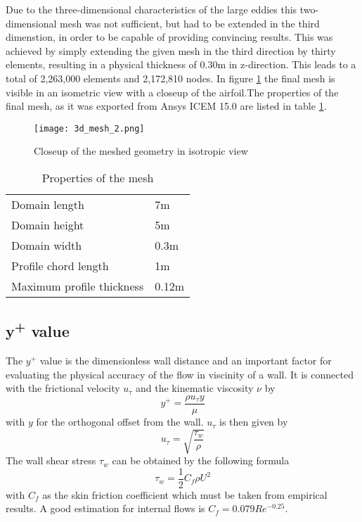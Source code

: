 Due to the three-dimensional characteristics of the large eddies this two-dimensional mesh was not sufficient, but had to be extended in the third dimenstion, in order to be capable of providing convincing results. This was achieved by simply extending the given mesh in the third direction by thirty elements, resulting in a physical thickness of 0.30m in z-direction. This leads to a total of 2,263,000 elements and 2,172,810 nodes. In figure \ref{fig:mesh_iso} the final mesh is visible in an isometric view with a closeup of the airfoil.The properties of the final mesh, as it was exported from Ansys ICEM 15.0 are listed in table \ref{tab:mesh_prop}.
\begin{figure}[ht]
\centering
\texttt{[image: 3d\_mesh\_2.png]}
\caption{Closeup of the meshed geometry in isotropic view}
\label{fig:mesh_iso}
\end{figure}
\begin{table}[ht]
\centering
\caption{Properties of the mesh}
\label{tab:mesh_prop}
\begin{tabular}{ll}
Domain length&7m\\
Domain height&5m\\
Domain width&0.3m\\
Profile chord length&1m\\
Maximum profile thickness&0.12m\\
\end{tabular}
\end{table}


\subsection{y\textsuperscript{+} value}
The $y^+$ value is the dimensionless wall distance and an important factor for evaluating the physical accuracy of the flow in viscinity of a wall. It is connected with the frictional velocity $u_{\tau}$ and the kinematic viscosity $\nu$ by
\begin{equation}
\label{eq:yplus}
y^+ = \frac{\rho u_{\tau}y}{\mu}
\end{equation}
with $y$ for the orthogonal offset from the wall. $u_{\tau}$ is then given by
\begin{equation}
u_{\tau} = \sqrt{\frac{\tau_w}{\rho}}
\end{equation}
The wall shear stress $\tau_w$ can be obtained by the following formula
\begin{equation}
\tau_w = \frac{1}{2} C_f \rho U^2
\end{equation}
with $C_f$ as the skin friction coefficient which must be taken from empirical results. A good estimation for internal flows is $C_f = 0.079 Re^{-0.25}$.


